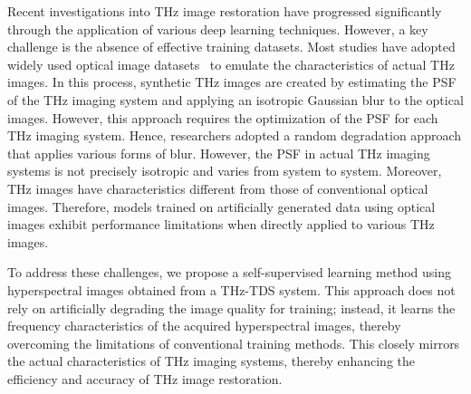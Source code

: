 Recent investigations into THz image restoration have progressed significantly through the application of various deep learning techniques. However, a key challenge is the absence of effective training datasets. Most studies have adopted widely used optical image datasets~\cite{agustsson2017ntire, timofte2017ntire} to emulate the characteristics of actual THz images. In this process, synthetic THz images are created by estimating the PSF of the THz imaging system and applying an isotropic Gaussian blur to the optical images.
However, this approach requires the optimization of the PSF for each THz imaging system. Hence, researchers adopted a random degradation approach that applies various forms of blur. However, the PSF in actual THz imaging systems is not precisely isotropic and varies from system to system. Moreover, THz images have characteristics different from those of conventional optical images. Therefore, models trained on artificially generated data using optical images exhibit performance limitations when directly applied to various THz images.

To address these challenges, we propose a self-supervised learning method using hyperspectral images obtained from a THz-TDS system. This approach does not rely on artificially degrading the image quality for training; instead, it learns the frequency characteristics of the acquired hyperspectral images, thereby overcoming the limitations of conventional training methods. This closely mirrors the actual characteristics of THz imaging systems, thereby enhancing the efficiency and accuracy of THz image restoration.





